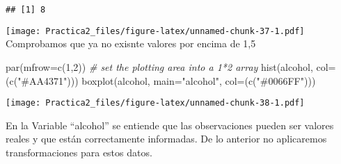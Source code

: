 \documentclass[
]{article}
\newenvironment{Shaded}{\begin{snugshade}}{\end{snugshade}}
\newcommand{\AttributeTok}[1]{\textcolor[rgb]{0.77,0.63,0.00}{#1}}
\newcommand{\CommentTok}[1]{\textcolor[rgb]{0.56,0.35,0.01}{\textit{#1}}}
\newcommand{\ConstantTok}[1]{\textcolor[rgb]{0.00,0.00,0.00}{#1}}
\newcommand{\ControlFlowTok}[1]{\textcolor[rgb]{0.13,0.29,0.53}{\textbf{#1}}}
\newcommand{\DecValTok}[1]{\textcolor[rgb]{0.00,0.00,0.81}{#1}}
\newcommand{\FunctionTok}[1]{\textcolor[rgb]{0.00,0.00,0.00}{#1}}
\newcommand{\NormalTok}[1]{#1}
\newcommand{\OtherTok}[1]{\textcolor[rgb]{0.56,0.35,0.01}{#1}}
\newcommand{\SpecialCharTok}[1]{\textcolor[rgb]{0.00,0.00,0.00}{#1}}
\newcommand{\StringTok}[1]{\textcolor[rgb]{0.31,0.60,0.02}{#1}}
\begin{document}
\begin{verbatim}
## [1] 8
\end{verbatim}

\begin{Shaded}
\end{Shaded}

\begin{Shaded}
\end{Shaded}

\texttt{[image: Practica2\_files/figure-latex/unnamed-chunk-37-1.pdf]}
Comprobamos que ya no exisnte valores por encima de 1,5

\begin{Shaded}
\begin{Highlighting}[]
\FunctionTok{par}\NormalTok{(}\AttributeTok{mfrow=}\FunctionTok{c}\NormalTok{(}\DecValTok{1}\NormalTok{,}\DecValTok{2}\NormalTok{))    }\CommentTok{\# set the plotting area into a 1*2 array}
\FunctionTok{hist}\NormalTok{(alcohol, }\AttributeTok{col=}\NormalTok{(}\FunctionTok{c}\NormalTok{(}\StringTok{"\#AA4371"}\NormalTok{)))}
\FunctionTok{boxplot}\NormalTok{(alcohol, }\AttributeTok{main=}\StringTok{"alcohol"}\NormalTok{, }\AttributeTok{col=}\NormalTok{(}\FunctionTok{c}\NormalTok{(}\StringTok{"\#0066FF"}\NormalTok{)))}
\end{Highlighting}
\end{Shaded}

\texttt{[image: Practica2\_files/figure-latex/unnamed-chunk-38-1.pdf]}

En la Variable ``alcohol'' se entiende que las observaciones pueden ser
valores reales y que están correctamente informadas. De lo anterior no
aplicaremos transformaciones para estos datos.
\end{document}
